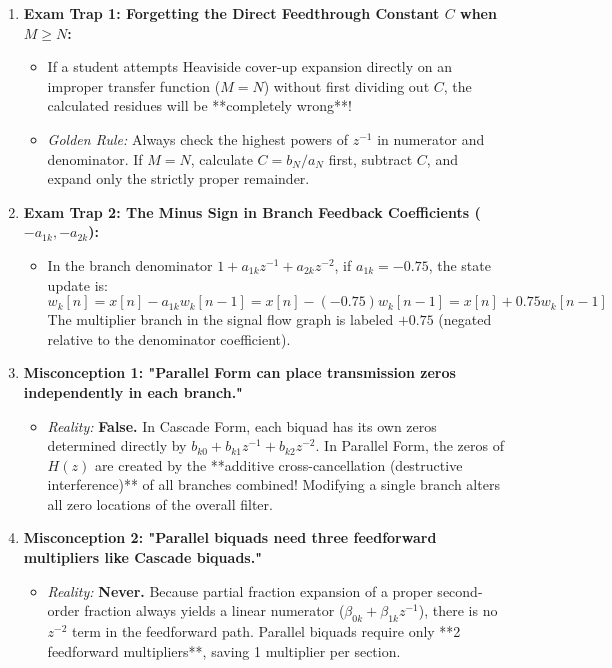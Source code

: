 \documentclass[11pt,a4paper]{article}
\begin{document}
\begin{enumerate}
    \item \textbf{Exam Trap 1: Forgetting the Direct Feedthrough Constant $C$ when $M \ge N$:}
    \begin{itemize}
        \item If a student attempts Heaviside cover-up expansion directly on an improper transfer function ($M = N$) without first dividing out $C$, the calculated residues will be **completely wrong**!
        \item \textit{Golden Rule:} Always check the highest powers of $z^{-1}$ in numerator and denominator. If $M = N$, calculate $C = b_N / a_N$ first, subtract $C$, and expand only the strictly proper remainder.
    \end{itemize}

    \item \textbf{Exam Trap 2: The Minus Sign in Branch Feedback Coefficients ($-a_{1k}, -a_{2k}$):}
    \begin{itemize}
        \item In the branch denominator $1 + a_{1k} z^{-1} + a_{2k} z^{-2}$, if $a_{1k} = -0.75$, the state update is:
        $$w_k[n] = x[n] - a_{1k} w_k[n-1] = x[n] - (-0.75) w_k[n-1] = x[n] + 0.75 w_k[n-1]$$
        The multiplier branch in the signal flow graph is labeled $+0.75$ (negated relative to the denominator coefficient).
    \end{itemize}

    \item \textbf{Misconception 1: "Parallel Form can place transmission zeros independently in each branch."}
    \begin{itemize}
        \item \textit{Reality:} \textbf{False.} In Cascade Form, each biquad has its own zeros determined directly by $b_{k0} + b_{k1}z^{-1} + b_{k2}z^{-2}$. In Parallel Form, the zeros of $H(z)$ are created by the **additive cross-cancellation (destructive interference)** of all branches combined! Modifying a single branch alters all zero locations of the overall filter.
    \end{itemize}

    \item \textbf{Misconception 2: "Parallel biquads need three feedforward multipliers like Cascade biquads."}
    \begin{itemize}
        \item \textit{Reality:} \textbf{Never.} Because partial fraction expansion of a proper second-order fraction always yields a linear numerator ($\beta_{0k} + \beta_{1k} z^{-1}$), there is no $z^{-2}$ term in the feedforward path. Parallel biquads require only **2 feedforward multipliers**, saving 1 multiplier per section.
    \end{itemize}
\end{enumerate}
\end{document}
